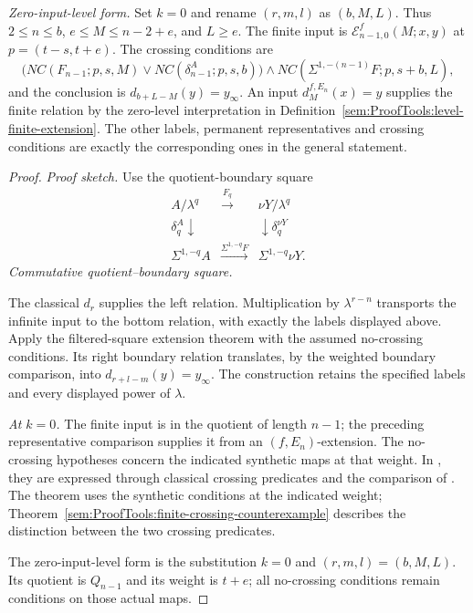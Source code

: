 \begin{theorem}
\textit{Zero-input-level form.}
Set $k=0$ and rename $(r,m,l)$ as $(b,M,L)$. Thus
$2\le n\le b$, $e\le M\le n-2+e$, and $L\ge e$.
The finite input is $\mathcal E^f_{n-1,0}(M;x,y)$ at
$p=(t-s,t+e)$. The crossing conditions are
\[
 \bigl(NC(F_{n-1};p,s,M)\lor NC(\delta_{n-1}^A;p,s,b)\bigr)
 \land NC(\Sigma^{1,-(n-1)}F;p,s+b,L),
\]
and the conclusion is $d_{b+L-M}(y)=y_\infty$.
An input $d_M^{f,E_n}(x)=y$ supplies the finite relation by the
zero-level interpretation in Definition~\ref{sem:ProofTools:level-finite-extension}.
The other labels, permanent representatives and crossing conditions are
exactly the corresponding ones in the general statement.
\end{theorem}
\begin{proof}
\textit{Proof sketch.}
Use the quotient-boundary square
\[
\begin{array}{ccc}
A/\lambda^q&\xrightarrow{F_q}&\nu Y/\lambda^q\\
\delta_q^A\downarrow&&\downarrow\delta_q^{\nu Y}\\
\Sigma^{1,-q}A&\xrightarrow{\Sigma^{1,-q}F}&\Sigma^{1,-q}\nu Y.
\end{array}
\]
\textit{Commutative quotient–boundary square.}

The classical $d_r$ supplies the left relation. Multiplication by
$\lambda^{r-n}$ transports the infinite input to the bottom relation,
with exactly the labels displayed above. Apply the filtered-square
extension theorem with the assumed no-crossing conditions. Its right
boundary relation translates, by the weighted boundary comparison, into
$d_{r+l-m}(y)=y_\infty$. The construction retains the specified labels and every displayed power of $\lambda$.

\textit{At $k=0$.} The finite input is in the quotient of length $n-1$;
the preceding representative comparison supplies it from an
$(f,E_n)$-extension. The no-crossing hypotheses concern the indicated
synthetic maps at that weight. In \cite[Theorem 6.1]{LWX126}, they
are expressed through classical crossing predicates and the comparison
of \cite[Proposition 5.10]{LWX126}. The theorem uses the synthetic conditions at the indicated weight;
Theorem~\ref{sem:ProofTools:finite-crossing-counterexample} describes
the distinction between the two crossing predicates.

The zero-input-level form is the substitution $k=0$ and
$(r,m,l)=(b,M,L)$. Its quotient is $Q_{n-1}$ and its weight is $t+e$;
all no-crossing conditions remain conditions on those actual maps.
\end{proof}


